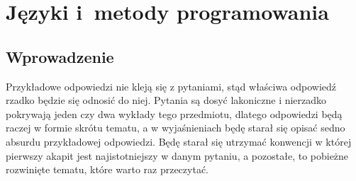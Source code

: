 \chapter{Języki i~metody programowania}
\PartialToc

\newtheorem{pyt}{Pytanie}
\newtheorem{odp}{Odpowiedź}

\newenvironment{opracowanie}[1][1]{
	\newcounter{nr_pytania}
	\setcounter{nr_pytania}{#1}
}{}
\newcommand{\pytanie}[1]
{
\section{\arabic{nr_pytania}. IT1A\_W08,IT1A\_U8}
\stepcounter{nr_pytania}
\pyt \textbf{#1}
\par
}

\newcommand{\answer}[5]{
\section{#1}

\noindent
{\textbf{Przykładowa odpowiedź:}}
#2
\ifthenelse
    {\equal{#3}{T}}
    {\textbf{PRAWDA}}
    {\ifthenelse
        {\equal{#3}{F}}
        {\textbf{FAŁSZ}}
        {\textbf{DIY}}
    }

\vspace{0.4cm}
\noindent
\textbf{Odpowiedź:}
#4

\ifthenelse{\equal{#5}{}}{}{
    \vspace{0.4cm}
    \noindent
    \textbf{Wyjaśnienie:} #5
}

}

\section{Wprowadzenie}

Przykładowe odpowiedzi nie kleją się z pytaniami, stąd właściwa odpowiedź rzadko będzie się odnosić do niej.
Pytania są dosyć lakoniczne i nierzadko pokrywają jeden czy dwa wykłady tego przedmiotu, dlatego odpowiedzi będą raczej w formie skrótu tematu, a w wyjaśnieniach będę starał się opisać sedno absurdu przykładowej odpowiedzi.
Będę starał się utrzymać konwencji w której pierwszy akapit jest najistotniejszy w danym pytaniu, a pozostałe, to pobieżne rozwinięte tematu, które warto raz przeczytać.


